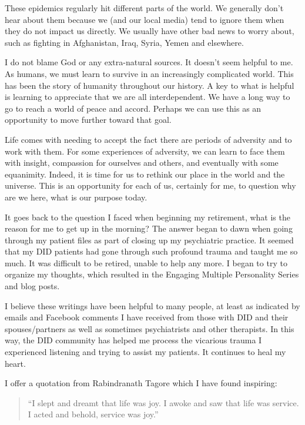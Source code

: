 \documentclass[]{book}
\begin{document}
These epidemics regularly hit different parts of the world. We generally don't hear about them because we (and our local media) tend to ignore them when they do not impact us directly. We usually have other bad news to worry about, such as fighting in Afghanistan, Iraq, Syria, Yemen and elsewhere.

I do not blame God or any extra-natural sources. It doesn't seem helpful to me. As humans, we must learn to survive in an increasingly complicated world. This has been the story of humanity throughout our history. A key to what is helpful is learning to appreciate that we are all interdependent. We have a long way to go to reach a world of peace and accord. Perhaps we can use this as an opportunity to move further toward that goal.

Life comes with needing to accept the fact there are periods of adversity and to work with them. For some experiences of adversity, we can learn to face them with insight, compassion for ourselves and others, and eventually with some equanimity. Indeed, it is time for us to rethink our place in the world and the universe. This is an opportunity for each of us, certainly for me, to question why are we here, what is our purpose today.

It goes back to the question I faced when beginning my retirement, what is the reason for me to get up in the morning? The answer began to dawn when going through my patient files as part of closing up my psychiatric practice. It seemed that my DID patients had gone through such profound trauma and taught me so much. It was difficult to be retired, unable to help any more. I began to try to organize my thoughts, which resulted in the Engaging Multiple Personality Series and blog posts.

I believe these writings have been helpful to many people, at least as indicated by emails and Facebook comments I have received from those with DID and their spouses/partners as well as sometimes psychiatrists and other therapists. In this way, the DID community has helped me process the vicarious trauma I experienced listening and trying to assist my patients. It continues to heal my heart.

I offer a quotation from Rabindranath Tagore which I have found inspiring:

\begin{quote}
``I slept and dreamt that life was joy. I awoke and saw that life was service. I acted and behold, service was joy.''
\end{quote}
\end{document}
